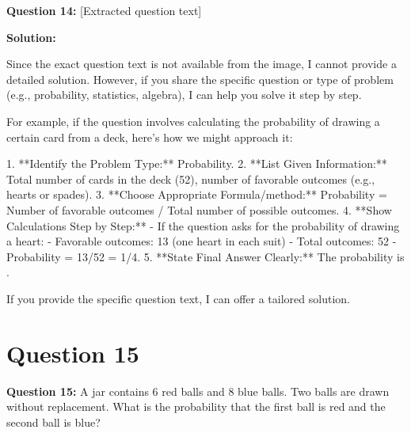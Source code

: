 \documentclass[12pt]{article}
\begin{document}
\textbf{Question 14:}  
[Extracted question text]

\textbf{Solution:}

Since the exact question text is not available from the image, I cannot provide a detailed solution. However, if you share the specific question or type of problem (e.g., probability, statistics, algebra), I can help you solve it step by step.

For example, if the question involves calculating the probability of drawing a certain card from a deck, here's how we might approach it:

1. **Identify the Problem Type:** Probability.
2. **List Given Information:** Total number of cards in the deck (52), number of favorable outcomes (e.g., hearts or spades).
3. **Choose Appropriate Formula/method:** Probability = Number of favorable outcomes / Total number of possible outcomes.
4. **Show Calculations Step by Step:**
   - If the question asks for the probability of drawing a heart:
     - Favorable outcomes: 13 (one heart in each suit)
     - Total outcomes: 52
     - Probability = 13/52 = 1/4.
5. **State Final Answer Clearly:** The probability is .

If you provide the specific question text, I can offer a tailored solution.
\newpage

\section{Question 15}

\textbf{Question 15:} A jar contains 6 red balls and 8 blue balls. Two balls are drawn without replacement. What is the probability that the first ball is red and the second ball is blue?
\end{document}
